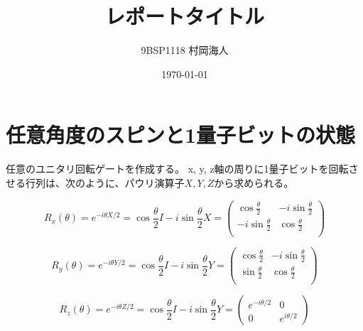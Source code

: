 \documentclass[platex,dvipdfmx]{jlreq}			%
\title{レポートタイトル}
\author{9BSP1118 村岡海人}
\date{\today}
\begin{document}
\maketitle
\section{任意角度のスピンと1量子ビットの状態}


任意のユニタリ回転ゲートを作成する。
x, y, z軸の周りに1量子ビットを回転させる行列は、次のように、パウリ演算子$X, Y, Z$から求められる。

\begin{equation}
    R_x(\theta) = e^{-i \theta X / 2} = \cos{\frac{\theta}{2}}I - i \sin{\frac{\theta}{2}} X = \begin{pmatrix}
        \cos{\frac{\theta}{2}} & -i \sin{\frac{\theta}{2}} \\
        -i \sin{\frac{\theta}{2}} & \cos{\frac{\theta}{2}} \\
    \end{pmatrix}
\end{equation}

\begin{equation}
    R_y(\theta) = e^{-i \theta Y / 2} = \cos{\frac{\theta}{2}} I - i \sin{\frac{\theta}{2}} Y =  \begin{pmatrix}
        \cos{\frac{\theta}{2}} & -i\sin{\frac{\theta}{2}} \\
        \sin{\frac{\theta}{2}} & \cos{\frac{\theta}{2}} \\
    \end{pmatrix}
\end{equation}

\begin{equation}
    R_z(\theta) = e^{-i \theta Z / 2} = \cos{\frac{\theta}{2}}I - i \sin{\frac{\theta}{2}} Y = \begin{pmatrix}
        e^{-i \theta / 2} & 0 \\
        0 & e^{i\theta/2}
    \end{pmatrix}
\end{equation}
\end{document}
